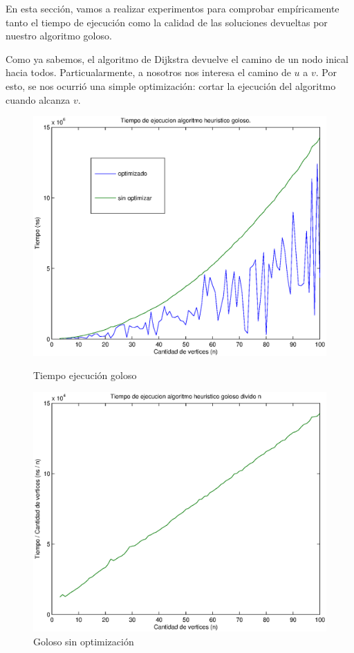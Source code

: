 En esta sección, vamos a realizar experimentos para comprobar empíricamente tanto el tiempo de ejecución como la calidad de las soluciones devueltas por nuestro algoritmo goloso.

Como ya sabemos, el algoritmo de Dijkstra devuelve el camino de un nodo inical hacia todos. Particualarmente, a nosotros nos interesa el camino de $u$ a $v$. Por esto, se nos ocurrió una simple optimización: cortar la ejecución del algoritmo cuando alcanza $v$.

\begin{figure}[H]
  \begin{minipage}{0.5\linewidth}
    \includegraphics[width=\linewidth]{graficos/goloso_tiempo.eps}
    \caption{Tiempo ejecución goloso}\label{fig:goloso-tiempo}
  \end{minipage}
  \hfill
  \begin{minipage}{0.5\linewidth}
    \includegraphics[width=\linewidth]{graficos/goloso_tiempo_div_n.eps}
    \caption{Goloso sin optimización}\label{fig:goloso-tiempo-n}
  \end{minipage}
\end{figure}

